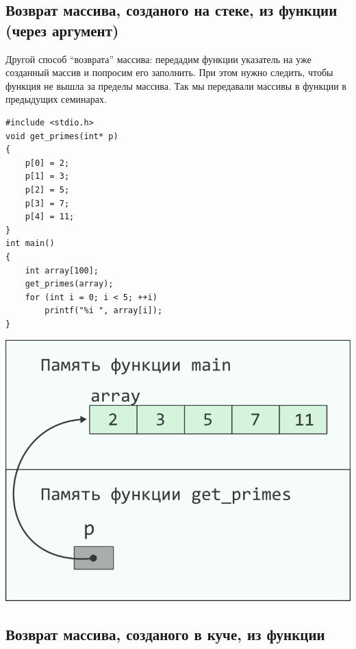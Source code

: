 \documentclass{article}
\begin{document}
\subsection*{Возврат массива, созданого на стеке, из функции (через аргумент)}

Другой способ ``возврата'' массива: передадим функции указатель на
уже созданный массив и попросим его заполнить.
При этом нужно следить, чтобы функция не вышла за пределы массива.
Так мы передавали массивы в функции в предыдущих семинарах.
\begin{multicols}{2}
\begin{lstlisting}
#include <stdio.h>
void get_primes(int* p) 
{
    p[0] = 2;
    p[1] = 3;
    p[2] = 5;
    p[3] = 7;
    p[4] = 11;	
}
int main() 
{
    int array[100];
    get_primes(array);
    for (int i = 0; i < 5; ++i)
        printf("%i ", array[i]);
}
\end{lstlisting}
\columnbreak
\begin{center}
\includegraphics[scale=1]{../images/pointer_schemes/function_return_arg_array.png}
\end{center}
\end{multicols}
\newpage
\subsection*{Возврат массива, созданого в куче, из функции}
\end{document}
